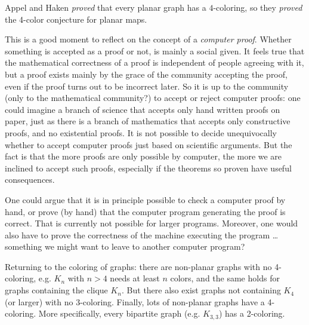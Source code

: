 Appel and Haken {\em proved} that every planar graph has a
$4$-coloring, so they {\em proved} the 4-color conjecture for planar
maps.

This is a good moment to reflect on the concept of a {\em computer
  proof}. Whether something is accepted as a proof or not, is mainly a
social given. It feels true that the mathematical correctness of a
proof is independent of people agreeing with it, but a proof exists
mainly by the grace of the community accepting the proof, even if the
proof turns out to be incorrect later. So it is up to the community
(only to the mathematical community?) to accept or reject computer
proofs: one could imagine a branch of science that accepts only hand
written proofs on paper, just as there is a branch of mathematics that
accepts only constructive proofs, and no existential proofs. It is not
possible to decide unequivocally whether to accept computer proofs just
based on scientific arguments. But the fact is that the more proofs are
only possible by computer, the more we are inclined to accept such
proofs, especially if the theorems so proven have useful consequences.

One could argue that it is in principle possible to check a computer
proof by hand, or prove (by hand) that the computer program generating
the proof is correct. That is currently not possible for larger
programs. Moreover, one would also have to prove the correctness of
the machine executing the program \ldots something we might want to
leave to another computer program?

Returning to the coloring of graphs: there are non-planar graphs with
no 4-coloring, e.g. $K_{n}$ with $n > 4$ needs at least $n$ colors,
and the same holds for graphs containing the clique $K_n$. But there also
exist graphs not containing $K_4$ (or larger) with no
3-coloring. Finally, lots of non-planar graphs have a 4-coloring. More
specifically, every bipartite graph (e.g. $K_{3,3}$) has a 2-coloring.


